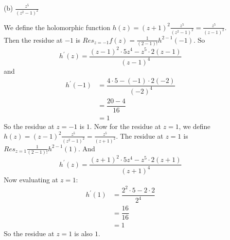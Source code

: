 \documentclass{article}
\begin{document}
\begin{itemize}
        \item [(b)] $\frac{z^{5}}{(z^{2} - 1)^{2}}$
            \begin{answer}
                We define the holomorphic function $h(z) = (z + 1)^{2}\frac{z^{5}}{(z^{2} - 1)^{2}} = \frac{z^{5}}{(z - 1)^{2}}$. Then the residue at $-1$ is $Res_{z = -1}f(z) = \frac{1}{(2 - 1)!}h^{2 - 1}(-1)$. So 
                    \begin{equation*}
                        h^{\prime}(z) = \dfrac{(z - 1)^{2}\cdot 5z^{4} - z^{5} \cdot 2 (z - 1)}{(z - 1)^{4}}
                    \end{equation*}
                and 
                    \begin{align*}
                        h^{\prime}(-1) &= \dfrac{4 \cdot 5 - (-1) \cdot 2 (-2)}{(-2)^{4}} \\
                                       &= \dfrac{20 - 4}{16}                              \\
                                       &= 1                                                 
                    \end{align*}
                So the residue at $z = -1$ is $1$. Now for the residue at $z = 1$, we define $h(z) = (z - 1)^{2}\frac{z^{5}}{(z^{2} - 1)^{2}} = \frac{z^{5}}{(z + 1)^{2}}$. The residue at $z = 1$ is $Res_{z = 1} \frac{1}{(2 - 1)!}h^{2 - 1}(1)$. And
                    \begin{equation*}
                        h^{\prime}(z) = \dfrac{(z + 1)^{2} \cdot 5z^{4} - z^{5} \cdot 2(z + 1)}{(z + 1)^{4}}
                    \end{equation*}
                Now evaluating at $z = 1$:
                    \begin{align*}
                        h^{\prime}(1) &= \dfrac{2^{2} \cdot 5 - 2 \cdot 2}{2^{4}} \\
                                      &= \dfrac{16}{16}                           \\
                                      &= 1                                          
                    \end{align*}
                So the residue at $z = 1$ is also $1$.
            \end{answer}


\end{itemize}
\end{document}

